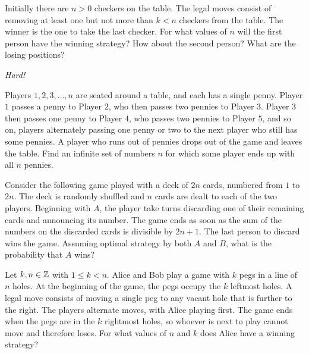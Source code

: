 \documentclass{article}
\begin{document}
\begin{exercise}
        Initially there are \(n>0\) checkers on the table.
        The legal moves consist of removing at least one but not more than \(k<n\) checkers from the table.
        The winner is the one to take the last checker.
        For what values of \(n\) will the first person have the winning strategy?
        How about the second person?
        What are the losing positions?
\end{exercise}

\emph{Hard!}

\begin{exercise}[1997 A2]
Players $1,2,3,\dots,n$ are seated around a table, and each has a single penny. Player $1$ passes a penny to Player $2$, who then passes two pennies to Player $3$. Player $3$ then passes one penny to Player $4$, who passes two pennies to Player $5$, and so on, players alternately passing one penny or two to the next player who still has some pennies. A player who runs out of pennies drops out of the game and leaves the table. Find an infinite set of numbers $n$ for which some player ends up with all $n$ pennies.
\end{exercise}

\begin{exercise}[1993 B2]
Consider the following game played with a deck of $2n$ cards, numbered from $1$ to $2n$. The deck is randomly shuffled and $n$ cards are dealt to each of the two players. Beginning with $A$, the player take turns discarding one of their remaining cards and announcing its number. The game ends as soon as the sum of the numbers on the discarded cards is divisible by $2n+1$. The last person to discard wins the game. Assuming optimal strategy by both $A$ and $B$, what is the probability that $A$ wins?
\end{exercise}

\begin{exercise}[2020 B2]
    Let \(k,n\in\mathbb{Z}\) with \(1\leq k<n\).
    Alice and Bob play a game with \(k\) pegs in a line of \(n\) holes.
    At the beginning of the game, the pegs occupy the \(k\) leftmost holes.
    A legal move consists of moving a single peg to any vacant hole that is further to the right.
    The players alternate moves, with Alice playing first.
    The game ends when the pegs are in the \(k\) rightmost holes, so whoever is next to play cannot move and therefore loses.
    For what values of \(n\) and \(k\) does Alice have a winning strategy?
\end{exercise}
\end{document}
